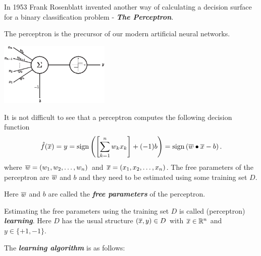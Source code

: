 \documentclass[a4paper,blends,pdf,colorBG,slideColor]{prosper}
\begin{document}
In 1953 Frank Rosenblatt invented another way of calculating a decision surface
for a binary classification problem - {\bf\em The Perceptron}.

The perceptron is the precursor of our modern artificial neural networks.
\begin{center}
\includegraphics[height=30mm]{figures/fig05-01.eps}
\end{center}
It is not difficult to see that a perceptron computes the following decision function
\[
\model{f}(\ol{x})= y = \sign\left(\left[\sum_{k=1}^n w_k x_k\right] + (-1) b\right) = \sign\left(\ol{w}\bullet\ol{x} - b\right).
\]
where $\overline{w} = (w_1, w_2, \ldots, w_n)$ and $\overline{x} = (x_1, x_2,\ldots,x_n)$.
The free parameters of the perceptron are $\overline{w}$ and $b$ and they need to be
estimated using some training set $D$.

\es

Here $\overline{w}$ and $b$ are called the {\bf\em free parameters} of the perceptron.

Estimating the free parameters using the training set $D$ is called (perceptron) {\bf\em learning}.  Here $D$ has the usual structure $( {\overline{x}}, {y} ) \in D$ with
$\overline{x} \in \mathbb{R}^{n}$ and $y \in \{+1,-1\}$.

The {\bf\em learning algorithm} is as follows:

\begin{center}
\end{center}
\es
\end{document}
